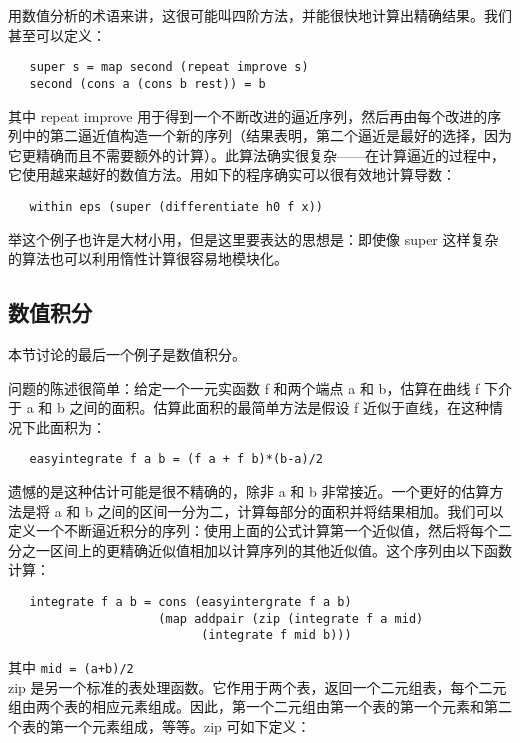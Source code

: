 \documentclass[12pt]{article}
\begin{document}
用数值分析的术语来讲，这很可能叫四阶方法，并能很快地计算出精确结果。我们甚至可以定义：

\begin{verbatim}
   super s = map second (repeat improve s)
   second (cons a (cons b rest)) = b
\end{verbatim}

其中 repeat improve 用于得到一个不断改进的逼近序列，然后再由每个改进的序列中的第二逼近值构造一个新的序列（结果表明，第二个逼近是最好的选择，因为它更精确而且不需要额外的计算）。此算法确实很复杂——在计算逼近的过程中，它使用越来越好的数值方法。用如下的程序确实可以很有效地计算导数：

\begin{verbatim}
   within eps (super (differentiate h0 f x))
\end{verbatim}
   
举这个例子也许是大材小用，但是这里要表达的思想是：即使像 super 这样复杂的算法也可以利用惰性计算很容易地模块化。

\subsection{数值积分}

本节讨论的最后一个例子是数值积分。

问题的陈述很简单：给定一个一元实函数 f 和两个端点 a 和 b，估算在曲线 f 下介于 a 和 b 之间的面积。估算此面积的最简单方法是假设 f 近似于直线，在这种情况下此面积为：

\begin{verbatim}
   easyintegrate f a b = (f a + f b)*(b-a)/2
\end{verbatim}

遗憾的是这种估计可能是很不精确的，除非 a 和 b 非常接近。一个更好的估算方法是将 a 和 b 之间的区间一分为二，计算每部分的面积并将结果相加。我们可以定义一个不断逼近积分的序列：使用上面的公式计算第一个近似值，然后将每个二分之一区间上的更精确近似值相加以计算序列的其他近似值。这个序列由以下函数计算：

\begin{verbatim}
   integrate f a b = cons (easyintergrate f a b)
                     (map addpair (zip (integrate f a mid)
                           (integrate f mid b)))
\end{verbatim}

其中 \verb"mid = (a+b)/2"\\

zip 是另一个标准的表处理函数。它作用于两个表，返回一个二元组表，每个二元组由两个表的相应元素组成。因此，第一个二元组由第一个表的第一个元素和第二个表的第一个元素组成，等等。zip 可如下定义：
\end{document}
